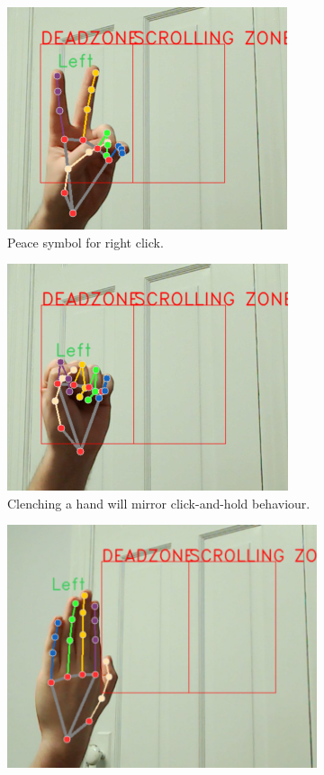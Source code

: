 \documentclass{article}
\begin{document}
\begin{figure}
\begin{subfigure}[T]{0.3\textwidth}
        \centering
        \includegraphics[width=.8\linewidth]{peace.png}
        \caption{Peace symbol for right click.}
    \end{subfigure}\hfill
    \begin{subfigure}[T]{0.3\textwidth}
        \centering
        \includegraphics[width=.8\linewidth]{fist.png}
        \caption{Clenching a hand will mirror click-and-hold behaviour.}
    \end{subfigure}
    \begin{subfigure}[T]{0.3\textwidth}
        \centering
        \includegraphics[width=.8\linewidth]{stop_inverted.png}

\end{subfigure}
\end{figure}
\end{document}
